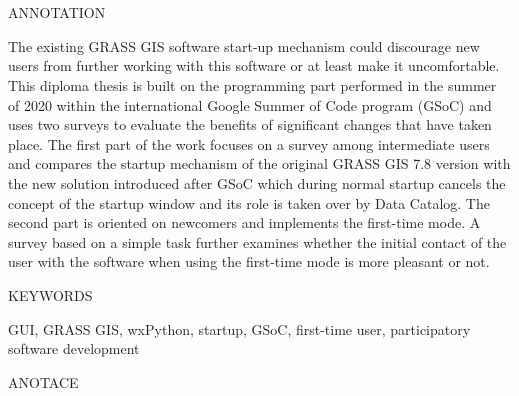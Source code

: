 \documentclass[a4paper,10pt,twoside]{article}
\begin{document}

\newpage ~ \newpage
\thispagestyle{empty}

\begin{figure}
 \centering 
 
\end{figure}


\newpage ~ \newpage
\newpage ~ \newpage
\thispagestyle{empty}


\renewcommand{\baselinestretch}{1.25} %


\begin{Large}
\noindent ANNOTATION
\end{Large}

\large
\noindent
The existing GRASS GIS software start-up mechanism could discourage new users from further working with this software or at least make it uncomfortable. This diploma thesis is built on the programming part performed in the summer of 2020 within the international Google Summer of Code program (GSoC) and uses two surveys to evaluate the benefits of significant changes that have taken place. The first part of the work focuses on a survey among intermediate users and compares the startup mechanism of the original GRASS GIS 7.8 version with the new solution introduced after GSoC which during normal startup cancels the concept of the startup window and its role is taken over by Data Catalog. The second part is oriented on newcomers and implements the first-time mode. A survey based on a simple task further examines whether the initial contact of the user with the software when using the first-time mode is more pleasant or not.

\vspace{2ex}
\begin{Large}
\noindent KEYWORDS
\end{Large}

\large
\noindent
\textrm{GUI, GRASS GIS, wxPython, startup, GSoC, first-time user, participatory software development}

\mbox{}
\vfill

\begin{Large}
\noindent ANOTACE
\end{Large} 
\end{document}

